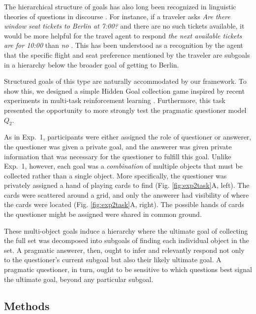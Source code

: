 \documentclass[11pt, floatsintext]{apa6}
\begin{document}
The hierarchical structure of goals has also long been recognized in linguistic theories of questions in discourse  \cite{Kuppevelt95_TopicalityDiscourse,Roberts96_InformationStructureDiscourse,Buring03_DtreesBeansBaccents,Groenendijk99_LogicOfInterrogation,rojas2014discourse}.
For instance, if a traveler asks \emph{Are there window seat tickets to Berlin at 7:00?} and there are no such tickets available, it would be more helpful for the travel agent to respond \emph{the next available tickets are for 10:00} than \emph{no} \cite{rojas2013roadsigns}.
This has been understood as a recognition by the agent that the specific flight and seat preference mentioned by the traveler are subgoals in a hierarchy below the broader goal of getting to Berlin. 

Structured goals of this type are naturally accommodated by our framework. 
To show this, we designed a simple Hidden Goal collection game inspired by recent experiments in multi-task reinforcement learning \cite{oh2017zero, andreas2017modular}.
Furthermore, this task presented the opportunity to more strongly test the pragmatic questioner model $Q_2$.


As in Exp.~1, participants were either assigned the role of questioner or answerer, the questioner was given a private goal, and the answerer was given private information that was necessary for the questioner to fulfill this goal.
Unlike Exp.~1, however, each goal was a \emph{combination} of multiple objects that must be collected rather than a single object.
More specifically, the questioner was privately assigned a hand of playing cards to find (Fig. \ref{fig:exp2task}A, left). 
The cards were scattered around a grid, and only the answerer had visibility of where the cards were located (Fig. \ref{fig:exp2task}A, right).
The possible hands of cards the questioner might be assigned were shared in common ground.

These multi-object goals induce a hierarchy where the ultimate goal of collecting the full set was decomposed into subgoals of finding each individual object in the set.
A pragmatic answerer, then, ought to infer and relevantly respond not only to the questioner's current subgoal but also their likely ultimate goal.
A pragmatic questioner, in turn, ought to be sensitive to which questions best signal the ultimate goal, beyond any particular subgoal.


\subsection{Methods}
\end{document}
